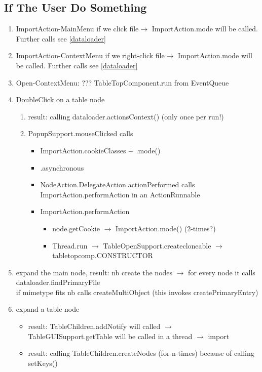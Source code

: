 \documentclass[12pt]{article}
\begin{document}
\subsection{If The User Do Something}
\begin{enumerate}
   \item ImportAction-MainMenu if we click file$\rightarrow$ ImportAction.mode will be called. Further calls see \ref{dataloader}
   \item ImportAction-ContextMenu if we right-click file$\rightarrow$ ImportAction.mode will be called. Further calls see \ref{dataloader}
   \item Open-ContextMenu: ??? TableTopComponent.run from EventQueue
   \item DoubleClick on a table node
	\begin{enumerate}
	\item \label{dataloader}result: calling dataloader.actionsContext() (only once per run!)
	\item PopupSupport.mouseClicked calls
	 \begin{itemize}
           \item ImportAction.cookieClasses + .mode()
           \item .asynchronous
           \item NodeAction.DelegateAction.actionPerformed
                    calls ImportAction.performAction in an ActionRunnable
           \item ImportAction.performAction
		\begin{itemize}
   		\item node.getCookie $\rightarrow$ ImportAction.mode() (2-times?)\\
   		\item Thread.run $\rightarrow$ TableOpenSupport.createcloneable $\rightarrow$ tabletopcomp.CONSTRUCTOR
		\end{itemize}
	\end{itemize}
	\end{enumerate}
   \item expand the main node, result: nb create the nodes $\rightarrow$ for every node it calls dataloader.findPrimaryFile\\
     if mimetype fits nb calls createMultiObject (this invokes createPrimaryEntry)
   \item expand a table node
	\begin{itemize}	
	\item result: TableChildren.addNotify will called $\rightarrow$ TableGUISupport.getTable will be called in a thread $\rightarrow$ import
	\item result: calling TableChildren.createNodes (for n-times) because of calling setKeys()
	\end{itemize}	
\end{enumerate}
\end{document}
